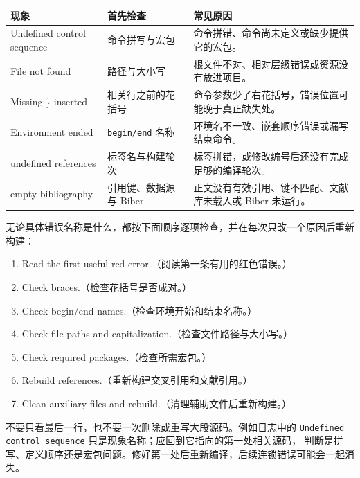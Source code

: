 \small
\noindent\begin{tabularx}{\textwidth}{>{\ttfamily\raggedright\arraybackslash}p{} >{\raggedright\arraybackslash}X >{\raggedright\arraybackslash}X}
\toprule
\normalfont\bfseries 现象 & \bfseries 首先检查 & \bfseries 常见原因 \\
\midrule
Undefined control sequence & 命令拼写与宏包 & 命令拼错、命令尚未定义或缺少提供它的宏包。 \\
File not found & 路径与大小写 & 根文件不对、相对层级错误或资源没有放进项目。 \\
Missing \} inserted & 相关行之前的花括号 & 命令参数少了右花括号，错误位置可能晚于真正缺失处。 \\
Environment ended & \texttt{begin/end} 名称 & 环境名不一致、嵌套顺序错误或漏写结束命令。 \\
undefined references & 标签名与构建轮次 & 标签拼错，或修改编号后还没有完成足够的编译轮次。 \\
empty bibliography & 引用键、数据源与 Biber & 正文没有有效引用、键不匹配、文献库未载入或 Biber 未运行。 \\
\bottomrule
\end{tabularx}
\normalsize

无论具体错误名称是什么，都按下面顺序逐项检查，并在每次只改一个原因后重新构建：

\begin{enumerate}[nosep]
    \item Read the first useful red error.（阅读第一条有用的红色错误。）
    \item Check braces.（检查花括号是否成对。）
    \item Check begin/end names.（检查环境开始和结束名称。）
    \item Check file paths and capitalization.（检查文件路径与大小写。）
    \item Check required packages.（检查所需宏包。）
    \item Rebuild references.（重新构建交叉引用和文献引用。）
    \item Clean auxiliary files and rebuild.（清理辅助文件后重新构建。）
\end{enumerate}

\begin{errorbox}
不要只看最后一行，也不要一次删除或重写大段源码。例如日志中的
\texttt{Undefined control sequence} 只是现象名称；应回到它指向的第一处相关源码，
判断是拼写、定义顺序还是宏包问题。修好第一处后重新编译，后续连锁错误可能会一起消失。
\end{errorbox}

